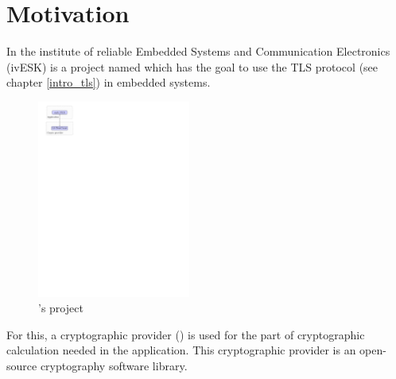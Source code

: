 ﻿\chapter{Motivation}
\label{motiv}
In the institute of reliable Embedded Systems and Communication Electronics
(ivESK) is a project named \embtls which has the goal to use the TLS protocol
(see chapter \ref{intro_tls}) in embedded systems.

\begin{figure}[!ht]
\centering
\includegraphics[trim=0cm 23.25cm 15cm 0cm,
height=6.5cm]{figures/intro_embtls.pdf}
\caption{\embtls's project}
\label{fig:motiv_embtls}

\end{figure}
For this, a cryptographic provider (\tomcrypt) is used for the part of
cryptographic calculation needed in the application.\newline
This cryptographic provider is an open-source cryptography software
library.\newline

